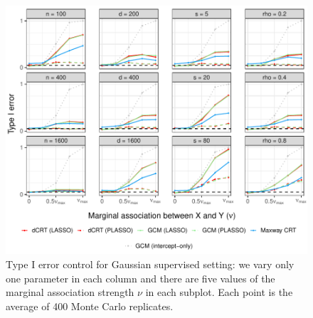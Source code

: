 \documentclass[aos]{imsart}
\theoremstyle{plain}
\theoremstyle{remark}
\newcommand{\new}[1]{{\color{darkgreen}{#1}}}
\begin{document}
\begin{figure}[h]
    \centering
    \includegraphics[width = \textwidth]{figures/gaussian_supervised_setting_null_partial.pdf}
    \caption{Type I error control for Gaussian supervised setting: we vary only one parameter in each column and there are five values of the marginal association strength $\nu$ in each subplot. Each point is the average of 400 Monte Carlo replicates. \new{All the standard errors are less than 0.026.}}
    \label{fig:gaussian_supervised_partial_null}
\end{figure}
\end{document}
